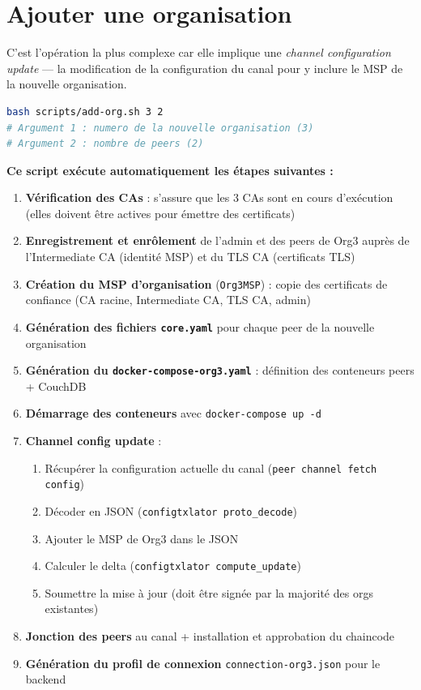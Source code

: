 \documentclass[12pt,a4paper,twoside]{report}
\begin{document}
\section{Ajouter une organisation}

C'est l'opération la plus complexe car elle implique une \textit{channel configuration update} --- la modification de la configuration du canal pour y inclure le MSP de la nouvelle organisation.

\begin{lstlisting}[language=bash, caption=Ajouter Org3 avec 2 peers]
bash scripts/add-org.sh 3 2
# Argument 1 : numero de la nouvelle organisation (3)
# Argument 2 : nombre de peers (2)
\end{lstlisting}

\textbf{Ce script exécute automatiquement les étapes suivantes :}
\begin{enumerate}
    \item \textbf{Vérification des CAs} : s'assure que les 3 CAs sont en cours d'exécution (elles doivent être actives pour émettre des certificats)
    \item \textbf{Enregistrement et enrôlement} de l'admin et des peers de Org3 auprès de l'Intermediate CA (identité MSP) et du TLS CA (certificats TLS)
    \item \textbf{Création du MSP d'organisation} (\texttt{Org3MSP}) : copie des certificats de confiance (CA racine, Intermediate CA, TLS CA, admin)
    \item \textbf{Génération des fichiers \texttt{core.yaml}} pour chaque peer de la nouvelle organisation
    \item \textbf{Génération du \texttt{docker-compose-org3.yaml}} : définition des conteneurs peers + CouchDB
    \item \textbf{Démarrage des conteneurs} avec \texttt{docker-compose up -d}
    \item \textbf{Channel config update} :
    \begin{enumerate}
        \item Récupérer la configuration actuelle du canal (\texttt{peer channel fetch config})
        \item Décoder en JSON (\texttt{configtxlator proto\_decode})
        \item Ajouter le MSP de Org3 dans le JSON
        \item Calculer le delta (\texttt{configtxlator compute\_update})
        \item Soumettre la mise à jour (doit être signée par la majorité des orgs existantes)
    \end{enumerate}
    \item \textbf{Jonction des peers} au canal + installation et approbation du chaincode
    \item \textbf{Génération du profil de connexion} \texttt{connection-org3.json} pour le backend
\end{enumerate}
\end{document}
